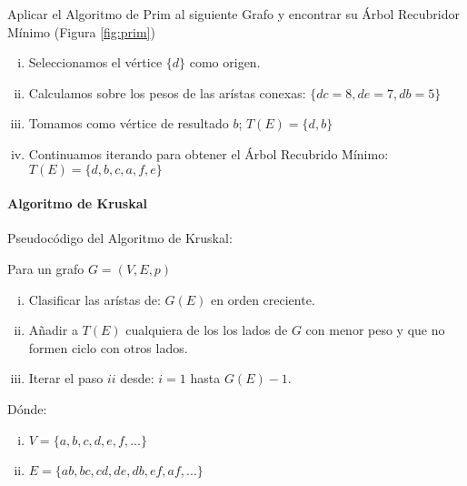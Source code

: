 \ejem Aplicar el Algoritmo de Prim al siguiente Grafo y encontrar su Árbol Recubridor Mínimo (Figura \ref{fig:prim})

\begin{enumerate}[i.]
\item Seleccionamos el vértice $\{d\}$ como origen.

\item Calculamos sobre los pesos de las arístas conexas: $\{dc = 8 , de = 7, db = 5\}$

\item Tomamos como vértice de resultado $b$; $T(E) = \{d,b\}$

\item Continuamos iterando para obtener el Árbol Recubrido Ḿínimo: $T(E) = \{d,b,c,a,f,e\}$
 
\end{enumerate}


\paragraph{{Algoritmo de Kruskal}}

\prog Pseudocódigo del Algoritmo de Kruskal:



\algo Para un grafo $G = (V,E,p)$

\begin{enumerate}[i.]
\item Clasificar las arístas de: $G(E)$ en orden creciente.
 
\item Añadir a $T(E)$ cualquiera de los los lados de $G$ con menor peso y que no formen ciclo con otros lados. 

\item Iterar el paso $ii$ desde: $i=1$ hasta $G(E) -1$.
\end{enumerate}



Dónde:

\begin{enumerate}[i.]

\item $V = \{a,b,c,d,e,f,...\}$ 

\item $E = \{ab,bc,cd,de,db,ef,af,...\}$ 

\end{enumerate}

